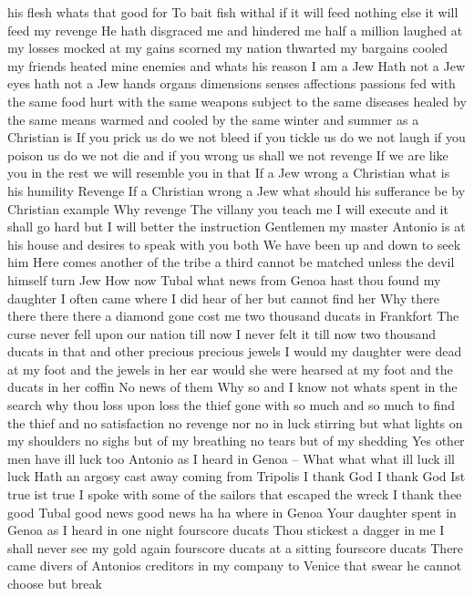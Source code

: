 his flesh whats that good for 
To bait fish withal if it will feed nothing else 
it will feed my revenge He hath disgraced me and 
hindered me half a million laughed at my losses 
mocked at my gains scorned my nation thwarted my 
bargains cooled my friends heated mine 
enemies and whats his reason I am a Jew Hath 
not a Jew eyes hath not a Jew hands organs 
dimensions senses affections passions fed with 
the same food hurt with the same weapons subject 
to the same diseases healed by the same means 
warmed and cooled by the same winter and summer as 
a Christian is If you prick us do we not bleed 
if you tickle us do we not laugh if you poison 
us do we not die and if you wrong us shall we not 
revenge If we are like you in the rest we will 
resemble you in that If a Jew wrong a Christian 
what is his humility Revenge If a Christian 
wrong a Jew what should his sufferance be by 
Christian example Why revenge The villany you 
teach me I will execute and it shall go hard but I 
will better the instruction 
Gentlemen my master Antonio is at his house and 
desires to speak with you both 
We have been up and down to seek him 
Here comes another of the tribe a third cannot be 
matched unless the devil himself turn Jew 
How now Tubal what news from Genoa hast thou 
found my daughter 
I often came where I did hear of her but cannot find her 
Why there there there there a diamond gone 
cost me two thousand ducats in Frankfort The curse 
never fell upon our nation till now I never felt it 
till now two thousand ducats in that and other 
precious precious jewels I would my daughter 
were dead at my foot and the jewels in her ear 
would she were hearsed at my foot and the ducats in 
her coffin No news of them Why so and I know 
not whats spent in the search why thou loss upon 
loss the thief gone with so much and so much to 
find the thief and no satisfaction no revenge 
nor no in luck stirring but what lights on my 
shoulders no sighs but of my breathing no tears 
but of my shedding 
Yes other men have ill luck too Antonio as I 
heard in Genoa -- 
What what what ill luck ill luck 
Hath an argosy cast away coming from Tripolis 
I thank God I thank God Ist true ist true 
I spoke with some of the sailors that escaped the wreck 
I thank thee good Tubal good news good news 
ha ha where in Genoa 
Your daughter spent in Genoa as I heard in one 
night fourscore ducats 
Thou stickest a dagger in me I shall never see my 
gold again fourscore ducats at a sitting 
fourscore ducats 
There came divers of Antonios creditors in my 
company to Venice that swear he cannot choose but break 
